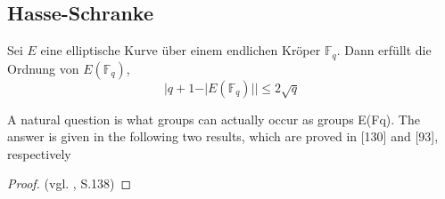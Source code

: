 \subsection{Hasse-Schranke}    
    \begin{theorem}[Hasse]
        Sei $E$ eine elliptische Kurve über einem endlichen Kröper $\mathbb{F}_q$. Dann erfüllt die Ordnung von $E(\mathbb{F}_q)$,
        \[ \vert q+1-\vert E(\mathbb{F}_q)| |\leq 2\sqrt q\]
    \end{theorem}
    A natural question is what groups can actually occur as groups E(Fq). The
    answer is given in the following two results, which are proved in [130] and [93],
    respectively
    
    \begin{proof} (vgl. \cite{silverman09}, S.138)
    
    \end{proof}
